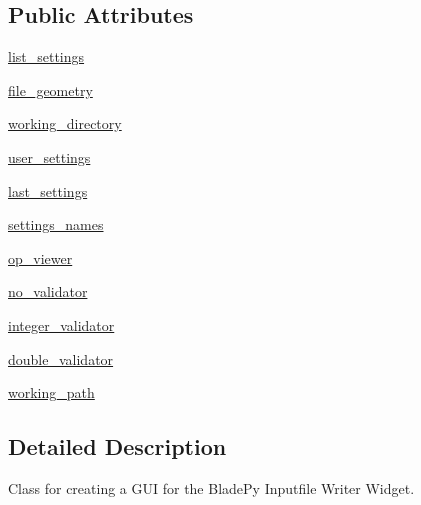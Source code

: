 \subsection*{Public Attributes}
\begin{DoxyCompactItemize}
\item 
\hyperlink{classbladepro__modules_1_1inputfile__writer_1_1_input_writer_window_ad019b7f076cb8b8b6820b6577d2058b6}{list\+\_\+settings}
\item 
\hyperlink{classbladepro__modules_1_1inputfile__writer_1_1_input_writer_window_a17d54af05f4344118b082c2384a88bec}{file\+\_\+geometry}
\item 
\hyperlink{classbladepro__modules_1_1inputfile__writer_1_1_input_writer_window_a267e018648a6f03f2bcc0a5b7c944f38}{working\+\_\+directory}
\item 
\hyperlink{classbladepro__modules_1_1inputfile__writer_1_1_input_writer_window_a4f8dfa192201c6c945621ff197680200}{user\+\_\+settings}
\item 
\hyperlink{classbladepro__modules_1_1inputfile__writer_1_1_input_writer_window_aa8731441bd4fdf801f74947c28d44ebf}{last\+\_\+settings}
\item 
\hyperlink{classbladepro__modules_1_1inputfile__writer_1_1_input_writer_window_a3ce7139eaa5256714413efdb9f870eab}{settings\+\_\+names}
\item 
\hyperlink{classbladepro__modules_1_1inputfile__writer_1_1_input_writer_window_af3daf3ca641b77de41d08750af03ef5e}{op\+\_\+viewer}
\item 
\hyperlink{classbladepro__modules_1_1inputfile__writer_1_1_input_writer_window_aa6e2504eda6ac2ee99e37d4b5f862f57}{no\+\_\+validator}
\item 
\hyperlink{classbladepro__modules_1_1inputfile__writer_1_1_input_writer_window_a33d2c6ecfa0800ef5eccfe0ce71475ee}{integer\+\_\+validator}
\item 
\hyperlink{classbladepro__modules_1_1inputfile__writer_1_1_input_writer_window_a007df19a104366a8bb63a8ed11e0e5e4}{double\+\_\+validator}
\item 
\hyperlink{classbladepro__modules_1_1inputfile__writer_1_1_input_writer_window_a2e8a633f45ef3a17852bc95deae51588}{working\+\_\+path}
\end{DoxyCompactItemize}


\subsection{Detailed Description}
Class for creating a G\+UI for the Blade\+Py Inputfile Writer Widget. 

